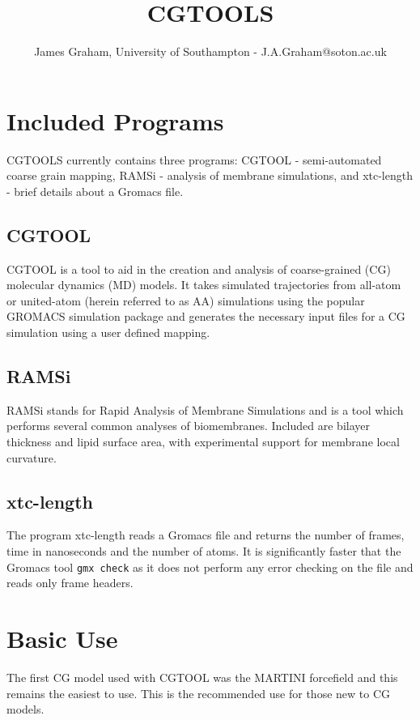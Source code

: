 \documentclass[10pt]{article}
\begin{document}
\title{CGTOOLS}
\author{James Graham, University of Southampton - J.A.Graham@soton.ac.uk}

\maketitle

\tableofcontents

\pagebreak

\section{Included Programs}
CGTOOLS currently contains three programs: CGTOOL - semi-automated coarse grain mapping, RAMSi - analysis of membrane simulations, and xtc-length - brief details about a Gromacs  file.

\subsection{CGTOOL}
CGTOOL is a tool to aid in the creation and analysis of coarse-grained (CG) molecular dynamics (MD) models.  It takes simulated trajectories from all-atom or united-atom (herein referred to as AA) simulations using the popular GROMACS simulation package and generates the necessary input files for a CG simulation using a user defined mapping.

\subsection{RAMSi}
RAMSi stands for Rapid Analysis of Membrane Simulations and is a tool which performs several common analyses of biomembranes.  Included are bilayer thickness and lipid surface area, with experimental support for membrane local curvature.

\subsection{xtc-length}
The program xtc-length reads a Gromacs  file and returns the number of frames, time in nanoseconds and the number of atoms.  It is significantly faster that the Gromacs tool \verb|gmx check| as it does not perform any error checking on the  file and reads only frame headers.

\section{Basic Use}
The first CG model used with CGTOOL was the MARTINI forcefield and this remains the easiest to use.  This is the recommended use for those new to CG models.
\end{document}
